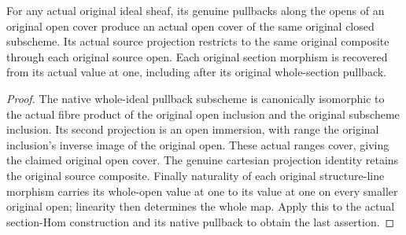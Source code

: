 \begin{lemma}
\label{lem:kn-nadel-bertini-original-incidence-cover}
\leanok
{}
For any actual original ideal sheaf, its genuine pullbacks along the opens
of an original open cover produce an actual open cover of the same
original closed subscheme. Its actual source projection restricts to the
same original composite through each original source open. Each original
section morphism is recovered from its actual value at one, including
after its original whole-section pullback.
\end{lemma}
\begin{proof}
The native whole-ideal pullback subscheme is canonically isomorphic to the
actual fibre product of the original open inclusion and the original
subscheme inclusion. Its second projection is an open immersion, with
range the original inclusion's inverse image of the original open. These
actual ranges cover, giving the claimed original open cover. The genuine
cartesian projection identity retains the original source composite.
Finally naturality of each original structure-line morphism carries its
whole-open value at one to its value at one on every smaller original
open; linearity then determines the whole map. Apply this to the actual
section-Hom construction and its native pullback to obtain the last
assertion.
\end{proof}

